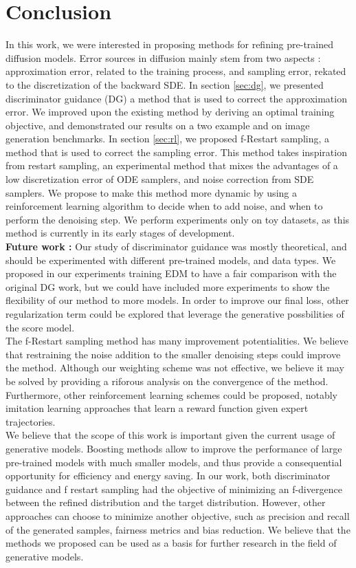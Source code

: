 %
\chapter{Conclusion}\label{sec:conclusion}
In this work, we were interested in proposing methods for refining pre-trained diffusion models. Error sources in diffusion mainly stem from two aspects : approximation error, related to the training process, and sampling error, rekated to the discretization of the backward SDE.
In section \ref{sec:dg}, we presented discriminator guidance (DG) a method that is used to correct the approximation error. We improved upon the existing method by deriving an optimal training objective, and demonstrated our results on a two example and on image generation benchmarks.
In section \ref{sec:rl}, we proposed f-Restart sampling, a method that is used to correct the sampling error. This method takes inspiration from restart sampling, an experimental method that mixes the advantages of a low discretization error of ODE samplers, and noise correction from SDE samplers. We propose to make this method more dynamic by using a reinforcement learning algorithm to decide when to add noise, and when to perform the denoising step. We perform experiments only on toy datasets, as this method is currently in its early stages of development.
\\
\textbf{Future work :} Our study of discriminator guidance was mostly theoretical, and should be experimented with different pre-trained models, and data types. We proposed in our experiments training EDM to have a fair comparison with the original DG work, but we could have included more experiments to show the flexibility of our method to more models. In order to improve our final loss, other regularization term could be explored that leverage the generative possbilities of the score model. 
\\
The f-Restart sampling method has many improvement potentialities. We believe that restraining the noise addition to the smaller denoising steps could improve the method. Although our weighting scheme was not effective, we believe it may be solved by providing a riforous analysis on the convergence of the method. Furthermore, other reinforcement learning schemes could be proposed, notably imitation learning approaches that learn a reward function given expert trajectories. 
\\
We believe that the scope of this work is important given the current usage of generative models. Boosting methods allow to improve the performance of large pre-trained models with much smaller models, and thus provide a consequential opportunity for efficiency and energy saving. In our work, both discriminator guidance and f restart sampling had the objective of minimizing an f-divergence between the refined distribution and the target distribution. However, other approaches can choose to minimize another objective, such as precision and recall of the generated samples, fairness metrics and bias reduction. We believe that the methods we proposed can be used as a basis for further research in the field of generative models.

